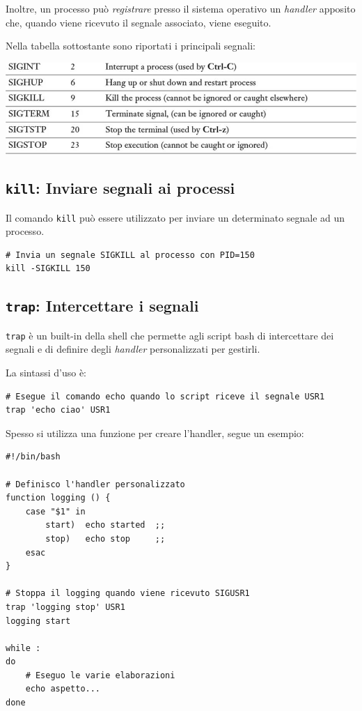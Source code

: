 \documentclass[a4paper]{report}
\newenvironment{code}{\begin{tcolorbox}[size=small]}{\end{tcolorbox}}
\begin{document}
Inoltre, un processo può \textit{registrare} presso il sistema operativo un \textit{handler} apposito che, quando viene ricevuto il segnale associato, viene eseguito.

Nella tabella sottostante sono riportati i principali segnali:

\begin{center}
	\includegraphics[width=0.8\linewidth]{signals}
\end{center}

\subsection{\texttt{kill}: Inviare segnali ai processi}

Il comando \texttt{kill} può essere utilizzato per inviare un determinato segnale ad un processo.

\begin{code} 
\begin{lstlisting}
# Invia un segnale SIGKILL al processo con PID=150
kill -SIGKILL 150
\end{lstlisting}
\end{code}

\subsection{\texttt{trap}: Intercettare i segnali}

\texttt{trap} è un built-in della shell che permette agli script bash di intercettare dei segnali e di definire degli \textit{handler} personalizzati per gestirli.

La sintassi d'uso è:
\begin{code} 
\begin{lstlisting}
# Esegue il comando echo quando lo script riceve il segnale USR1
trap 'echo ciao' USR1
\end{lstlisting}
\end{code}

Spesso si utilizza una funzione per creare l'handler, segue un esempio:
\begin{code} 
\begin{lstlisting}
#!/bin/bash

# Definisco l'handler personalizzato
function logging () {
	case "$1" in
		start)	echo started  ;;
		stop)	echo stop	  ;;
	esac
}

# Stoppa il logging quando viene ricevuto SIGUSR1
trap 'logging stop' USR1
logging start

while :
do
	# Eseguo le varie elaborazioni
	echo aspetto...
done
\end{lstlisting}
\end{code}
\end{document}

